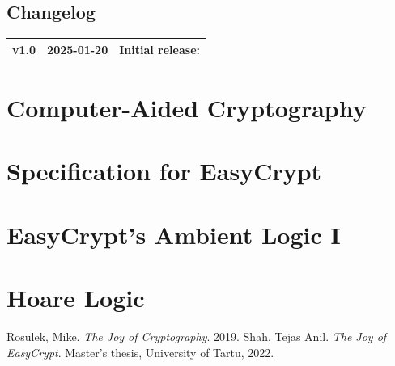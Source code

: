 \documentclass[11pt,openany]{article}
\begin{document}
\vfill
\subsection*{Changelog}
\large
\begin{tabular}{@{} L{0.05\textwidth} L{0.2\textwidth} L{0.7\textwidth} @{}} %
	\toprule
	v1.0 & 2025-01-20 & Initial release: \\%
	\bottomrule
\end{tabular}

\newpage

\tableofcontents
\newpage
\section{Computer-Aided Cryptography}
%

\newpage
\section{Specification for EasyCrypt}

%

\newpage
\section{EasyCrypt's Ambient Logic I}

%
%
%
%

\newpage
\section{Hoare Logic}


\newpage
%

\vfill
\begin{thebibliography}{9}\large
{}
Rosulek, Mike. \emph{The Joy of Cryptography}. 2019.
Shah, Tejas Anil. \emph{The Joy of EasyCrypt}. Master's thesis, University of Tartu, 2022.
\end{thebibliography}

\newpage
\appendix

%
%
\end{document}

